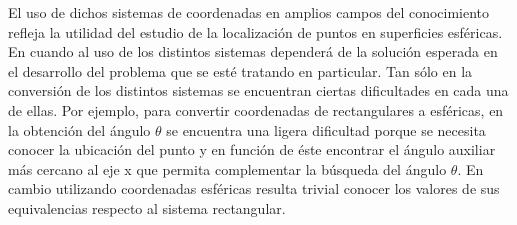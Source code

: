 
\hspace{4mm} El uso de dichos sistemas de coordenadas en amplios campos del conocimiento refleja la utilidad del estudio de la localización de puntos en superficies esféricas. En cuando al uso de los distintos sistemas dependerá de la solución esperada en el desarrollo del problema que se esté tratando en particular. Tan sólo en la conversión de los distintos sistemas se encuentran ciertas dificultades en cada una de ellas. Por ejemplo, para convertir coordenadas de rectangulares a esféricas, en la obtención del ángulo ${\theta}$ se encuentra una ligera dificultad porque se necesita conocer la ubicación del punto y en función de éste encontrar el ángulo auxiliar más cercano al eje x que permita complementar la búsqueda del ángulo ${\theta}$. En cambio utilizando coordenadas esféricas resulta trivial conocer los valores de sus equivalencias respecto al sistema rectangular. \cite{ecured}

